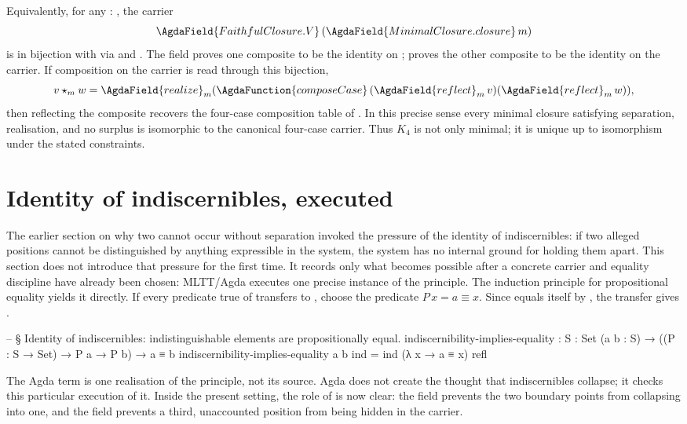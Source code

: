 \documentclass[11pt]{article}
\begin{document}
Equivalently, for any  : , the
carrier
\[
\AgdaField{FaithfulClosure.V}\,(\AgdaField{MinimalClosure.closure}\,m)
\]
is in bijection with  via 
and .  The field 
proves one composite to be the identity on ;
 proves the other composite to be the
identity on the carrier.  If composition on the carrier is read through
this bijection,
\[
v \star_m w =
\AgdaField{realize}_m
  (\AgdaFunction{composeCase}\,(\AgdaField{reflect}_m\,v)
                              (\AgdaField{reflect}_m\,w)),
\]
then reflecting the composite recovers the four-case composition table
of .  In this precise sense every minimal
closure satisfying separation, realisation, and no surplus is
isomorphic to the canonical four-case carrier.  Thus $K_4$ is not only
minimal; it is unique up to isomorphism under the stated constraints.

\section{Identity of indiscernibles, executed}

The earlier section on why two cannot occur without separation invoked
the pressure of the identity of indiscernibles: if two alleged positions cannot
be distinguished by anything expressible in the system, the system has
no internal ground for holding them apart.  This section does not
introduce that pressure for the first time.  It records only what
becomes possible after a
concrete carrier and equality discipline have already been chosen:
MLTT/Agda executes one precise instance of the principle.  The induction
principle for propositional equality yields it directly.  If every
predicate true of  transfers to , choose the
predicate \(P\,x = a \equiv x\).  Since  equals itself by
, the transfer gives 
\AgdaSymbol{\ensuremath{\equiv}} .

\begin{code}
-- § Identity of indiscernibles: indistinguishable elements are propositionally equal.
indiscernibility-implies-equality :
  {S : Set} (a b : S) →
  ((P : S → Set) → P a → P b) →
  a ≡ b
indiscernibility-implies-equality a b ind = ind (λ x → a ≡ x) refl
\end{code}

The Agda term is one realisation of the principle, not its source.
Agda does not create the thought that indiscernibles collapse; it
checks this particular execution of it.  Inside the present setting,
the role of  is now clear: the
 field prevents the two boundary points from
collapsing into one, and the  field prevents a third,
unaccounted position from being hidden in the carrier.
\end{document}
